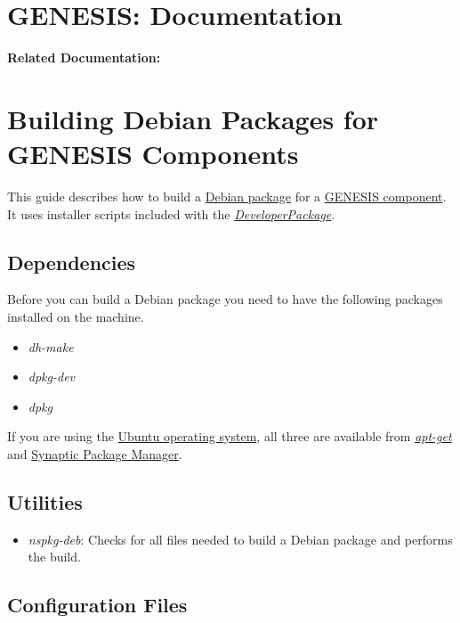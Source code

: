 \documentclass[12pt]{article}
\begin{document}
\section*{GENESIS: Documentation}

{\bf Related Documentation:}

\section*{Building Debian Packages for GENESIS Components}

This guide describes how to build a \href{http://www.debian.org/doc/manuals/apt-howto/index.en.html#contents}{Debian package} for a \href{../reserved-words/reserved-words.tex}{GENESIS component}. It uses installer scripts included with the \href{../developer-package/developer-package.tex}{\it DeveloperPackage}.

\subsection*{Dependencies}

Before you can build a Debian package you need to have the following packages installed on the machine.
\begin{itemize}
   \item{\it dh-make}
   \item{\it dpkg-dev}
   \item{\it dpkg}
\end{itemize}

If you are using the \href{http://www.ubuntu.com/}{Ubuntu operating system}, all three are available from \href{http://www.debian.org/doc/manuals/apt-howto/}{\it apt-get} and \href{http://www.nongnu.org/synaptic/}{Synaptic Package Manager}.


\subsection*{Utilities}
\begin{itemize}
\item {\it nspkg-deb}: Checks for all files needed to build a Debian package and performs the build.
\end{itemize}
\subsection*{Configuration Files}
\end{document}
